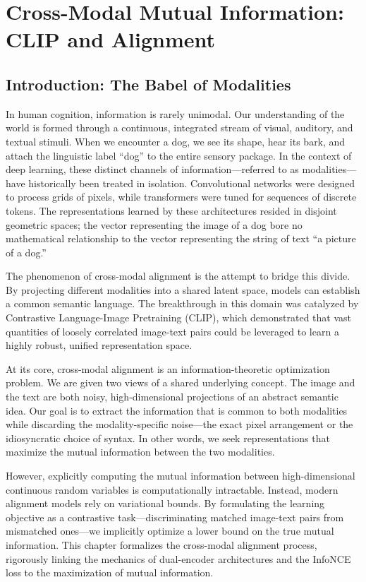 \chapter{Cross-Modal Mutual Information: CLIP and Alignment}

\section{Introduction: The Babel of Modalities}

In human cognition, information is rarely unimodal. Our understanding of the world is formed through a continuous, integrated stream of visual, auditory, and textual stimuli. When we encounter a dog, we see its shape, hear its bark, and attach the linguistic label ``dog'' to the entire sensory package. In the context of deep learning, these distinct channels of information—referred to as modalities—have historically been treated in isolation. Convolutional networks were designed to process grids of pixels, while transformers were tuned for sequences of discrete tokens. The representations learned by these architectures resided in disjoint geometric spaces; the vector representing the image of a dog bore no mathematical relationship to the vector representing the string of text ``a picture of a dog.''

The phenomenon of cross-modal alignment is the attempt to bridge this divide. By projecting different modalities into a shared latent space, models can establish a common semantic language. The breakthrough in this domain was catalyzed by Contrastive Language-Image Pretraining (CLIP), which demonstrated that vast quantities of loosely correlated image-text pairs could be leveraged to learn a highly robust, unified representation space. 

At its core, cross-modal alignment is an information-theoretic optimization problem. We are given two views of a shared underlying concept. The image and the text are both noisy, high-dimensional projections of an abstract semantic idea. Our goal is to extract the information that is common to both modalities while discarding the modality-specific noise—the exact pixel arrangement or the idiosyncratic choice of syntax. In other words, we seek representations that maximize the mutual information between the two modalities. 

However, explicitly computing the mutual information between high-dimensional continuous random variables is computationally intractable. Instead, modern alignment models rely on variational bounds. By formulating the learning objective as a contrastive task—discriminating matched image-text pairs from mismatched ones—we implicitly optimize a lower bound on the true mutual information. This chapter formalizes the cross-modal alignment process, rigorously linking the mechanics of dual-encoder architectures and the InfoNCE loss to the maximization of mutual information.


